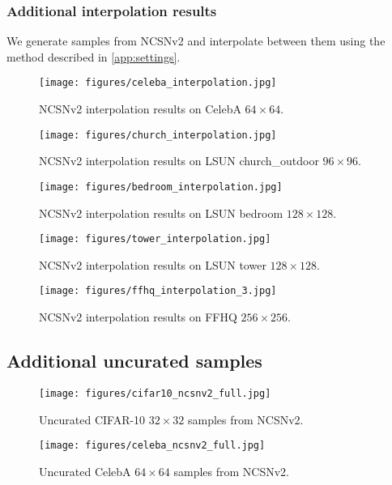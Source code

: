 \documentclass{article}
\begin{document}
\subsubsection{Additional interpolation results}
We generate samples from NCSNv2 and interpolate between them using the method described in \cref{app:settings}. 
\begin{figure}[H]
    \centering
    \texttt{[image: figures/celeba\_interpolation.jpg]}
    \caption{NCSNv2 interpolation results on CelebA $64\times 64$.}
\end{figure}
\begin{figure}[H]
    \centering
    \texttt{[image: figures/church\_interpolation.jpg]}
    \caption{NCSNv2 interpolation results on LSUN church\_outdoor $96\times 96$.}
\end{figure}
\begin{figure}[H]
    \centering
    \texttt{[image: figures/bedroom\_interpolation.jpg]}
    \caption{NCSNv2 interpolation results on LSUN bedroom $128\times 128$.}
\end{figure}
\newpage
\vspace*{\fill}
\begin{figure}[H]
    \centering
    \texttt{[image: figures/tower\_interpolation.jpg]}
    \caption{NCSNv2 interpolation results on LSUN tower $128\times 128$.}
\end{figure}
\begin{figure}[H]
    \centering
    \texttt{[image: figures/ffhq\_interpolation\_3.jpg]}
    \caption{NCSNv2 interpolation results on FFHQ $256\times 256$.}
\end{figure}
\vspace*{\fill}

\newpage
\subsection{Additional uncurated samples}\label{app:samples}
\vspace*{\fill}
\begin{figure}[H]
    \centering
    \texttt{[image: figures/cifar10\_ncsnv2\_full.jpg]}
    \caption{Uncurated CIFAR-10 $32\times 32$ samples from NCSNv2.}
    \label{fig:cifar10_full}
\end{figure}
\vspace*{\fill}

\newpage
\vspace*{\fill}
\begin{figure}[H]
    \centering
    \texttt{[image: figures/celeba\_ncsnv2\_full.jpg]}
    \caption{Uncurated CelebA $64\times 64$ samples from NCSNv2.}
    \label{fig:celeba_full}
\end{figure}
\vspace*{\fill}
\end{document}

